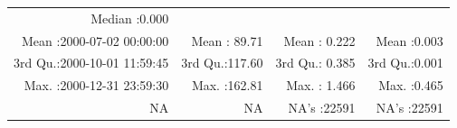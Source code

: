 \documentclass[
  10pt,
  a4paper,oneside]{article}
\begin{document}
\begin{longtable}[]{@{}rrrr@{}}
\begin{minipage}[t]{0.19\columnwidth}
Median :0.000\strut
\end{minipage}\tabularnewline
\begin{minipage}[t]{0.33\columnwidth}\raggedleft
Mean :2000-07-02 00:00:00\strut
\end{minipage} & \begin{minipage}[t]{0.19\columnwidth}\raggedleft
Mean : 89.71\strut
\end{minipage} & \begin{minipage}[t]{0.19\columnwidth}\raggedleft
Mean : 0.222\strut
\end{minipage} & \begin{minipage}[t]{0.19\columnwidth}\raggedleft
Mean :0.003\strut
\end{minipage}\tabularnewline
\begin{minipage}[t]{0.33\columnwidth}\raggedleft
3rd Qu.:2000-10-01 11:59:45\strut
\end{minipage} & \begin{minipage}[t]{0.19\columnwidth}\raggedleft
3rd Qu.:117.60\strut
\end{minipage} & \begin{minipage}[t]{0.19\columnwidth}\raggedleft
3rd Qu.: 0.385\strut
\end{minipage} & \begin{minipage}[t]{0.19\columnwidth}\raggedleft
3rd Qu.:0.001\strut
\end{minipage}\tabularnewline
\begin{minipage}[t]{0.33\columnwidth}\raggedleft
Max. :2000-12-31 23:59:30\strut
\end{minipage} & \begin{minipage}[t]{0.19\columnwidth}\raggedleft
Max. :162.81\strut
\end{minipage} & \begin{minipage}[t]{0.19\columnwidth}\raggedleft
Max. : 1.466\strut
\end{minipage} & \begin{minipage}[t]{0.19\columnwidth}\raggedleft
Max. :0.465\strut
\end{minipage}\tabularnewline
\begin{minipage}[t]{0.33\columnwidth}\raggedleft
NA\strut
\end{minipage} & \begin{minipage}[t]{0.19\columnwidth}\raggedleft
NA\strut
\end{minipage} & \begin{minipage}[t]{0.19\columnwidth}\raggedleft
NA's :22591\strut
\end{minipage} & \begin{minipage}[t]{0.19\columnwidth}\raggedleft
NA's :22591\strut
\end{minipage}\tabularnewline
\bottomrule
\end{longtable}
\end{document}
